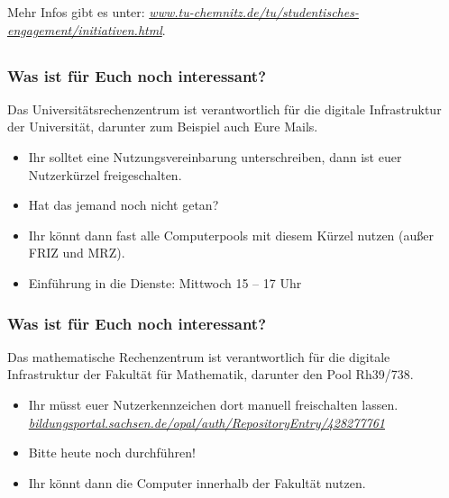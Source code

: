 \documentclass[10pt]{beamer}
\begin{document}
\begin{frame}
	\vspace*{3.8cm}

	Mehr Infos gibt es unter: \textit{\href{https://www.tu-chemnitz.de/tu/studentisches-engagement/initiativen.html}{www.tu-chemnitz.de/tu/studentisches-engagement/initiativen.html}}.
\end{frame}

\subsection*{ }

\begin{frame}
	\frametitle{Was ist für Euch noch interessant?}

	\begin{block}{\vphantom{X}}
		Das Universitätsrechenzentrum ist verantwortlich für die digitale Infrastruktur der Universität, darunter zum Beispiel auch Eure Mails.
	\end{block}

	\begin{itemize}
		\item Ihr solltet eine Nutzungsvereinbarung unterschreiben, dann ist euer Nutzerkürzel freigeschalten.
		\item Hat das jemand noch nicht getan?
		\item Ihr könnt dann fast alle Computerpools mit diesem Kürzel nutzen (außer FRIZ und MRZ).
		\item Einführung in die Dienste: Mittwoch 15 -- 17 Uhr
	\end{itemize}
\end{frame}

\begin{frame}
	\frametitle{Was ist für Euch noch interessant?}

	\begin{block}{\vphantom{X}}
		Das mathematische Rechenzentrum ist verantwortlich für die digitale Infrastruktur der Fakultät für Mathematik, darunter den Pool Rh39/738.
	\end{block}

	\begin{itemize}
		\item Ihr müsst euer Nutzerkennzeichen dort manuell freischalten lassen. \textit{\href{https://bildungsportal.sachsen.de/opal/auth/RepositoryEntry/428277761}{bildungsportal.sachsen.de/opal/auth/RepositoryEntry/428277761}}
		\item Bitte heute noch durchführen!
		\item Ihr könnt dann die Computer innerhalb der Fakultät nutzen.
	\end{itemize}
\end{frame}
\end{document}
